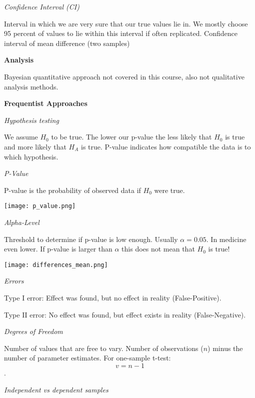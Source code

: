 \textit{Confidence Interval (CI)} \smallskip

Interval in which we are very sure that our true values lie in. We mostly choose 95 percent of values to lie within this interval if often replicated. 
Confidence interval of mean difference (two samples) \medskip

 \textbf{Analysis} \smallskip

 Bayesian quantitative approach not covered in this course, also not qualitative analysis methods. \medskip

\textbf{Frequentist Approaches} \smallskip

\textit{Hypothesis testing} \smallskip

We assume $H_0$ to be true. The lower our p-value the less likely that $H_0$ is true and more likely that $H_A$ is true. P-value indicates how compatible the data is to which hypothesis. \medskip

\columnbreak

\textit{P-Value} \smallskip

P-value is the probability of observed data if $H_0$ were true.

\begin{center}
	\texttt{[image: p\_value.png]}
\end{center}


\textit{Alpha-Level} \smallskip

Threshold to determine if p-value is low enough. Usually $\alpha = 0.05$. In medicine even lower.
If p-value is larger than $\alpha$ this does not mean that $H_0$ is true! \medskip


\begin{center}
	\texttt{[image: differences\_mean.png]}
\end{center}



\textit{Errors} \smallskip

Type I error: Effect was found, but no effect in reality (False-Positive).

Type II error: No effect was found, but effect exists in reality (False-Negative). \medskip

\textit{Degrees of Freedom} \smallskip

Number of values that are free to vary. Number of observations ($n$) minus the number of parameter estimates. For one-sample t-test: $$v = n-1$$. \medskip

\textit{Independent vs dependent samples} \smallskip

